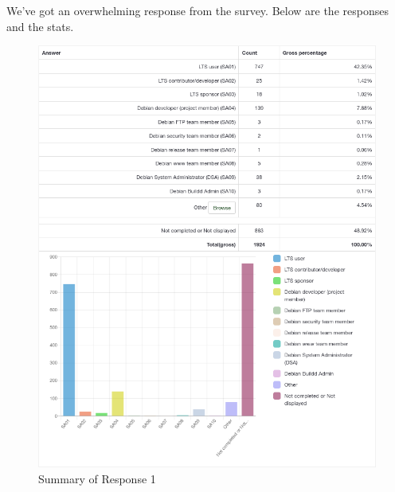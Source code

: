 \documentclass{article}
\begin{document}
\vspace{3mm}
We've got an overwhelming response from the survey. Below are the responses and the stats.

\newpage

\begin{figure}
\centering
\includegraphics[width=15cm]{assets/1-summary.png}
\caption{Summary of Response 1}
\end{figure}
\end{document}
